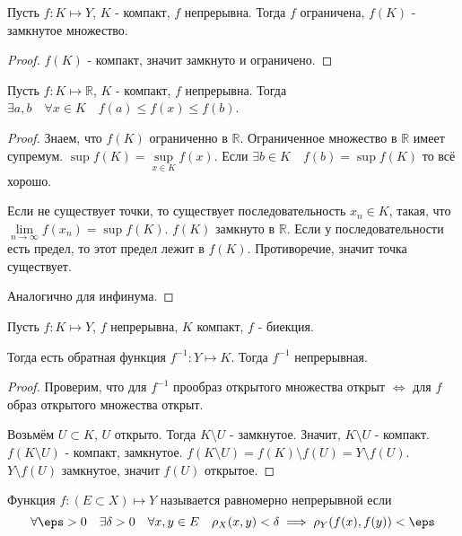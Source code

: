 \begin{consequence} \thmslashn

    Пусть $f : K \mapsto Y$, $K$ - компакт,  $f$ непрерывна. Тогда  $f$ ограничена,  $f(K)$ - замкнутое множество.
    \begin{proof}
        $f(K)$ - компакт, значит замкнуто и ограничено.
    \end{proof}
\end{consequence}
\begin{consequence} \thmslashn

    Пусть $f : K \mapsto \mathbb{R}$, $K$ - компакт, $f$ непрерывна. Тогда $\exists{a, b}\quad \forall{x\in K}\quad  f(a) \le f(x) \le f(b)$.
    \begin{proof} \thmslashn
    
        Знаем, что $f(K)$ ограниченно в $\mathbb{R}$. Ограниченное множество в $ \mathbb{R}$ имеет супремум. $\sup f(K) = \sup\limits_{x\in K} f(x)$. Если $\exists{b\in K}\quad f(b) = \sup f(K)$ то всё хорошо.

        Если не существует точки, то существует последовательность $x_{n}\in K$, такая, что $\lim\limits_{n \to \infty} f(x_{n}) = \sup f(K)$. $f(K)$ замкнуто в $\mathbb{R}$. Если у последовательности есть предел, то этот предел лежит в $f(K)$. Противоречие, значит точка существует.

        Аналогично для инфинума.
\end{proof}
\end{consequence}
\begin{theorem} \thmslashn

    Пусть $f : K \mapsto Y$, $f$ непрерывна, $K$ компакт, $f$ - биекция.

    Тогда есть обратная функция $f^{-1} : Y \mapsto K$. Тогда $f^{-1}$ непрерывная.
    \begin{proof} \thmslashn
    
        Проверим, что для $f^{-1}$ прообраз открытого множества открыт $\iff$ для $f$ образ открытого множества открыт.

        Возьмём $U \subset K$, $U$ открыто. Тогда $K \setminus U$ - замкнутое. Значит, $K \setminus U$ - компакт. $f(K \setminus U)$ - компакт, замкнутое. $f(K \setminus U) = f(K) \setminus f(U) = Y \setminus f(U)$. $Y \setminus f(U)$ замкнутое, значит $f(U)$ открытое.
    \end{proof}
\end{theorem}
\begin{definition} \thmslashn 

    Функция $f : (E \subset X) \mapsto Y$ называется равномерно непрерывной если
    \[\forall{\eps > 0}\quad \exists{\delta > 0}\quad \forall{x, y\in E}\quad \rho_{X}(x,y) < \delta \implies \rho_{Y}(f(x), f(y)) < \eps\]
\end{definition}
